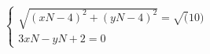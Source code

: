 \documentclass[preview]{standalone}
\begin{document}
\begin{align*}
\begin{cases} \sqrt{(xN - 4)^2 + (yN - 4)^2} = \sqrt(10)  \\ 3xN - yN + 2 = 0 \end{cases}
\end{align*}
\end{document}
